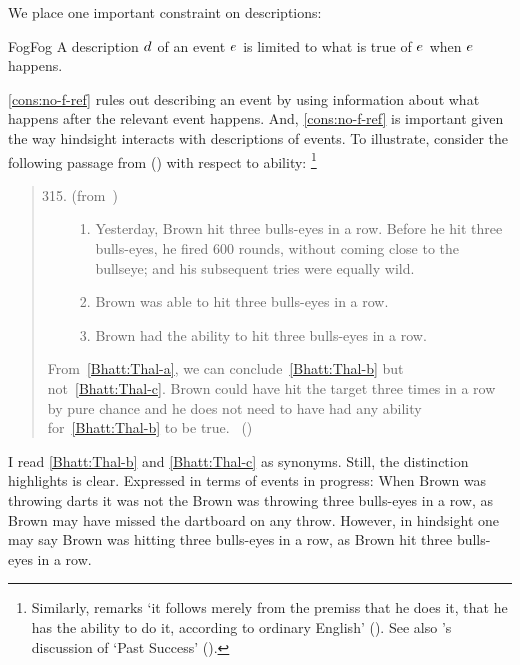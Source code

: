 \begin{note}
  We place one important constraint on descriptions:

  \begin{constraint}{Fog}{Fog}%
    \label{cons:no-f-ref}%
    A description \(d\sb{}\) of an event \(e\sb{}\) is limited to what is true of \(e\sb{}\) when \(e\sb{}\) happens.
  \end{constraint}

  \noindent%
  \autoref{cons:no-f-ref} rules out describing an event by using information about what happens after the relevant event happens.
  And, \autoref{cons:no-f-ref} is important given the way hindsight interacts with descriptions of events.
  To illustrate, consider the following passage from \citeauthor{Bhatt:2008aa} (\citeyear{Bhatt:2008aa}) with respect to ability:%
  \footnote{
    Similarly, \citeauthor{Austin:1961vz} remarks `it follows merely from the premiss that he does it, that he has the ability to do it, according to ordinary English' (\citeyear[175]{Austin:1961vz}).
    See also \citeauthor{Boylan:2020aa}'s discussion of `Past Success' (\citeyear[\S1.1]{Boylan:2020aa}).
  }
  \begin{quote}
    \begin{enumerate}[label=(\arabic*)]
      \setcounter{enumi}{314}
    \item
      (from~\cite{Thalberg:1969ta})
      \begin{enumerate}[label=\alph*., ref=(315\alph*)]
      \item
        \label{Bhatt:Thal-a}
        Yesterday, Brown hit three bulls-eyes in a row.
        Before he hit three bulls-eyes, he fired 600 rounds, without coming close to the bullseye; and his subsequent tries were equally wild.
      \item
        \label{Bhatt:Thal-b}
        Brown was able to hit three bulls-eyes in a row.
      \item
        \label{Bhatt:Thal-c}
        Brown had the ability to hit three bulls-eyes in a row.
      \end{enumerate}
    \end{enumerate}
    From~\ref{Bhatt:Thal-a}, we can conclude~\ref{Bhatt:Thal-b} but not~\ref{Bhatt:Thal-c}.
    Brown could have hit the target three times in a row by pure chance and he does not need to have had any ability for~\ref{Bhatt:Thal-b} to be true.\newline
    \mbox{ }\hfill\mbox{(\citeyear[167]{Bhatt:2008aa})}
  \end{quote}
  I read \ref{Bhatt:Thal-b} and \ref{Bhatt:Thal-c} as synonyms.
  Still, the distinction \citeauthor{Bhatt:2008aa} highlights is clear.
  Expressed in terms of events in progress:
  When Brown was throwing darts it was not the Brown was throwing three bulls-eyes in a row, as Brown may have missed the dartboard on any throw.
  However, in hindsight one may say Brown was hitting three bulls-eyes in a row, as Brown hit three bulls-eyes in a row.


\end{note}
